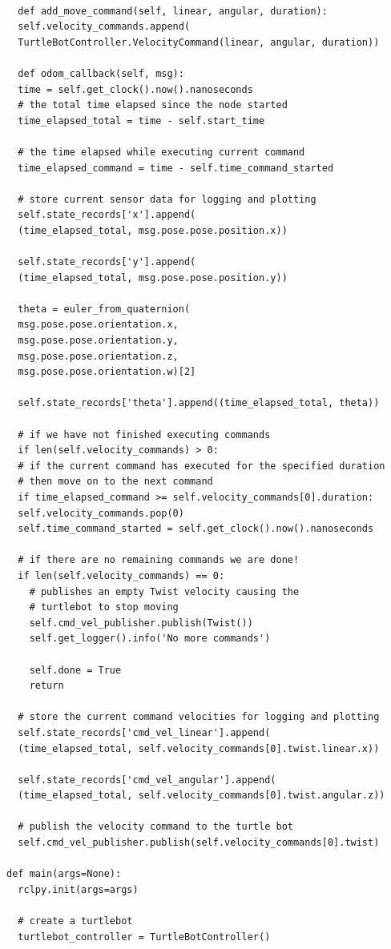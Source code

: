 \documentclass{article}
\begin{document}
\begin{verbatim}
  
  def add_move_command(self, linear, angular, duration):
  self.velocity_commands.append(
  TurtleBotController.VelocityCommand(linear, angular, duration))
  
  def odom_callback(self, msg):
  time = self.get_clock().now().nanoseconds
  # the total time elapsed since the node started
  time_elapsed_total = time - self.start_time

  # the time elapsed while executing current command
  time_elapsed_command = time - self.time_command_started

  # store current sensor data for logging and plotting
  self.state_records['x'].append(
  (time_elapsed_total, msg.pose.pose.position.x))

  self.state_records['y'].append(
  (time_elapsed_total, msg.pose.pose.position.y))

  theta = euler_from_quaternion(
  msg.pose.pose.orientation.x,
  msg.pose.pose.orientation.y,
  msg.pose.pose.orientation.z,
  msg.pose.pose.orientation.w)[2]
  
  self.state_records['theta'].append((time_elapsed_total, theta))

  # if we have not finished executing commands
  if len(self.velocity_commands) > 0:
  # if the current command has executed for the specified duration
  # then move on to the next command
  if time_elapsed_command >= self.velocity_commands[0].duration:
  self.velocity_commands.pop(0)
  self.time_command_started = self.get_clock().now().nanoseconds

  # if there are no remaining commands we are done!
  if len(self.velocity_commands) == 0:
    # publishes an empty Twist velocity causing the 
    # turtlebot to stop moving
    self.cmd_vel_publisher.publish(Twist())
    self.get_logger().info('No more commands')

    self.done = True
    return
  
  # store the current command velocities for logging and plotting
  self.state_records['cmd_vel_linear'].append(
  (time_elapsed_total, self.velocity_commands[0].twist.linear.x))
  
  self.state_records['cmd_vel_angular'].append(
  (time_elapsed_total, self.velocity_commands[0].twist.angular.z))
  
  # publish the velocity command to the turtle bot
  self.cmd_vel_publisher.publish(self.velocity_commands[0].twist)

def main(args=None):
  rclpy.init(args=args)

  # create a turtlebot
  turtlebot_controller = TurtleBotController()


\end{verbatim}
\end{document}
